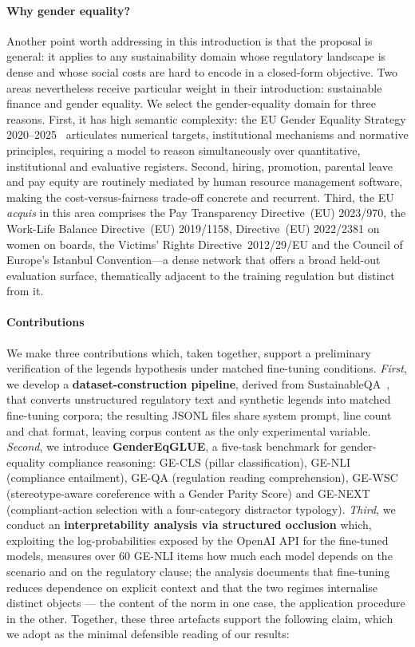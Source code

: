 \documentclass[pdflatex, sn-apa]{sn-jnl}%
\theoremstyle{thmstyleone}%
\theoremstyle{thmstyletwo}%
\theoremstyle{thmstylethree}%
\begin{document}
\paragraph{Why gender equality?}
Another point worth addressing in this introduction is that the proposal is
general: it applies to any sustainability domain whose regulatory landscape is
dense and whose social costs are hard to encode in a closed-form objective. Two
areas nevertheless receive particular weight in their introduction: sustainable
finance and gender equality. We select the gender-equality domain for three
reasons. First, it has high semantic complexity: the EU Gender Equality Strategy
2020--2025~\citep{europeancommission2020strategy} articulates numerical targets,
institutional mechanisms and normative principles, requiring a model to reason
simultaneously over quantitative, institutional and evaluative registers. Second,
hiring, promotion, parental leave and pay equity are routinely mediated by human
resource management software, making the cost-versus-fairness trade-off concrete
and recurrent. Third, the EU \emph{acquis} in this area comprises the Pay
Transparency Directive~(EU) 2023/970, the Work-Life Balance Directive~(EU)
2019/1158, Directive~(EU) 2022/2381 on women on boards, the Victims' Rights
Directive~2012/29/EU and the Council of Europe's Istanbul Convention---a dense
network that offers a broad held-out evaluation surface, thematically adjacent to
the training regulation but distinct from it.
 
\paragraph{Contributions}
We make three contributions which, taken together, support a preliminary
verification of the legends hypothesis under matched fine-tuning conditions.
\emph{First}, we develop a \textbf{dataset-construction pipeline}, derived from
SustainableQA~\citep{wattenberg2025sustainableqa}, that converts unstructured
regulatory text and synthetic legends into matched fine-tuning corpora; the
resulting JSONL files share system prompt, line count and chat format, leaving
corpus content as the only experimental variable. \emph{Second}, we introduce
\textbf{GenderEqGLUE}, a five-task benchmark for gender-equality compliance
reasoning: GE-CLS (pillar classification), GE-NLI (compliance entailment), GE-QA
(regulation reading comprehension), GE-WSC (stereotype-aware coreference with a
Gender Parity Score) and GE-NEXT (compliant-action selection with a four-category
distractor typology). \emph{Third}, we conduct an \textbf{interpretability
analysis via structured occlusion} which, exploiting the log-probabilities
exposed by the OpenAI API for the fine-tuned models, measures over 60 GE-NLI
items how much each model depends on the scenario and on the regulatory clause;
the analysis documents that fine-tuning reduces dependence on explicit context
and that the two regimes internalise distinct objects --- the content of the norm
in one case, the application procedure in the other.
Together, these three artefacts support the following claim, which we adopt as
the minimal defensible reading of our results:
\end{document}
